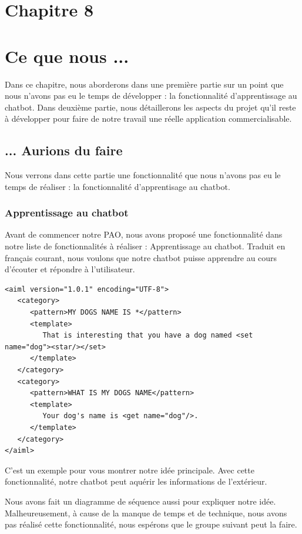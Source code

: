 \section*{Chapitre 8}
\section{Ce que nous ...}
\indent Dans ce chapitre, nous aborderons dans une première partie sur un point que nous n'avons pas eu le temps de développer :  la fonctionnalité d’apprentissage au chatbot. Dans deuxième partie, nous détaillerons les aspects du projet qu'il reste à développer pour faire de notre travail une réelle application commercialisable.

\subsection{... Aurions du faire}
\indent Nous verrons dans cette partie une fonctionnalité que nous n'avons pas eu le temps de réaliser : la fonctionnalité d'apprentisage au chatbot.

\subsubsection{Apprentissage au chatbot}
\indent Avant de commencer notre PAO, nous avons proposé une fonctionnalité dans notre liste de fonctionnalités à réaliser : Apprentissage au chatbot. Traduit en français courant, nous voulons que notre chatbot puisse apprendre au cours d'écouter et répondre à l'utilisateur. 

\begin{lstlisting}[frame=none,aboveskip=0.5em]
<aiml version="1.0.1" encoding="UTF-8">
   <category>
      <pattern>MY DOGS NAME IS *</pattern>
      <template>
         That is interesting that you have a dog named <set name="dog"><star/></set>
      </template>  
   </category>  
   <category>
      <pattern>WHAT IS MY DOGS NAME</pattern>
      <template>
         Your dog's name is <get name="dog"/>.
      </template>  
   </category>  
</aiml>
\end{lstlisting}

\indent C'est un exemple pour vous montrer notre idée principale. Avec cette fonctionnalité, notre chatbot peut aquérir les informations de l'extérieur.

\indent Nous avons fait un diagramme de séquence aussi pour expliquer notre idée. Malheureusement, à cause de la manque de temps et de technique, nous avons pas réalisé cette fonctionnalité, nous espérons que le groupe suivant peut la faire. 


